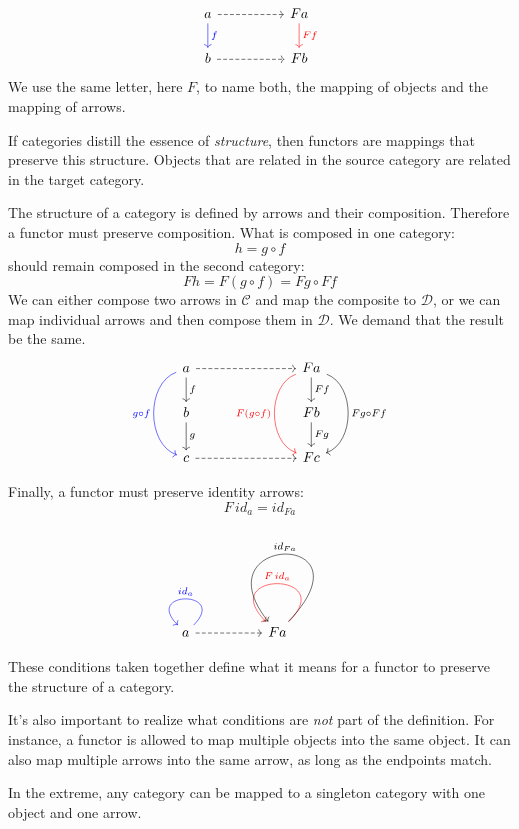 \documentclass[DaoFP]{subfiles}
\begin{document}
\[
 \begin{tikzcd}
 a 
 \arrow[d, blue, "f"]
\arrow[rr, dashed]
 && F a
  \arrow[d, red, "F f"]
 \\
 b 
 \arrow[rr, dashed]
&& F b
  \end{tikzcd}
\]
We use the same letter, here $F$, to name both, the mapping of objects and the mapping of arrows. 

If categories distill the essence of \emph{structure}, then functors are mappings that preserve this structure. Objects that are related in the source category are related in the target category. 

The structure of a category is defined by arrows and their composition. Therefore a functor must preserve composition. What is composed in one category:
\[ h = g \circ f \]
should remain composed in the second category:
\[ F h = F (g \circ f) = F g \circ F f \]
We can either compose two arrows in $\mathcal{C}$ and map the composite to $\mathcal{D}$, or we can map individual arrows and then compose them in $\mathcal{D}$. We demand that the result be the same.
\[
 \begin{tikzcd}
 a 
 \arrow[d, "f"]
\arrow[rrr, dashed]
\arrow[dd, bend right = 70, blue, "g \circ f"']
 &&& F a
  \arrow[d, "F f"]
  \arrow[dd, bend left = 70, "F g \circ F f"]
  \arrow[dd, bend right = 70, red, "F (g \circ f)"']
 \\
 b 
 \arrow[d, "g"]
&&& F b
 \arrow[d, "F g"]
 \\
 c
 \arrow[rrr, dashed]
&&& F c
  \end{tikzcd}
\]

Finally, a functor must preserve identity arrows:
\[ F\, id_a = id_{F a} \]

\[
 \begin{tikzcd}
 a 
  \arrow[loop, blue,  "id_a"']
\arrow[rr, dashed]
 && F a
  \arrow[loop, red, "F \, id_{a}"']
  \arrow[loop, controls={+(2.5, 2.6) and +(-2, 2.5)}, "id_{F a}"']
  \end{tikzcd}
\]

These conditions taken together define what it means for a functor to preserve the structure of a category.

It's also important to realize what conditions are \emph{not} part of the definition. For instance, a functor is allowed to map multiple objects into the same object. It can also map multiple arrows into the same arrow, as long as the endpoints match. 

In the extreme, any category can be mapped to a singleton category with one object and one arrow.
\end{document}
